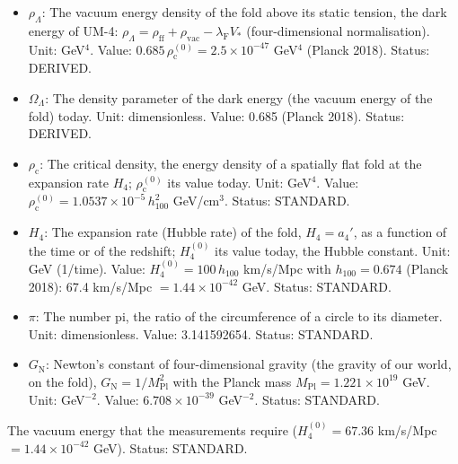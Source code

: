 \documentclass[
  10pt,
]{article}
\providecommand{\tightlist}{%
  \setlength{\itemsep}{0pt}\setlength{\parskip}{0pt}}
\begin{document}
\begin{itemize}
\tightlist
\item
  \(\rho_\Lambda\): The vacuum energy density of the fold above its
  static tension, the dark energy of UM-4:
  \(\rho_\Lambda = \rho_{\mathrm{ff}} + \rho_{\mathrm{vac}} - \lambda_{\mathrm{F}}V_*\)
  (four-dimensional normalisation). Unit: GeV\(^4\). Value:
  \(0.685\,\rho_{\mathrm{c}}^{(0)} = 2.5\times10^{-47}\) GeV\(^4\)
  (Planck 2018). Status: DERIVED.
\item
  \(\Omega_\Lambda\): The density parameter of the dark energy (the
  vacuum energy of the fold) today. Unit: dimensionless. Value: 0.685
  (Planck 2018). Status: DERIVED.
\item
  \(\rho_{\mathrm{c}}\): The critical density, the energy density of a
  spatially flat fold at the expansion rate \(H_4\);
  \(\rho_{\mathrm{c}}^{(0)}\) its value today. Unit: GeV\(^4\). Value:
  \(\rho_{\mathrm{c}}^{(0)} = 1.0537\times10^{-5}\,h_{100}^2\)
  GeV/cm\(^3\). Status: STANDARD.
\item
  \(H_4\): The expansion rate (Hubble rate) of the fold, \(H_4 = a_4'\),
  as a function of the time or of the redshift; \(H_4^{(0)}\) its value
  today, the Hubble constant. Unit: GeV (1/time). Value:
  \(H_4^{(0)} = 100\,h_{100}\) km/s/Mpc with \(h_{100} = 0.674\) (Planck
  2018): 67.4 km/s/Mpc \(= 1.44\times10^{-42}\) GeV. Status: STANDARD.
\item
  \(\pi\): The number pi, the ratio of the circumference of a circle to
  its diameter. Unit: dimensionless. Value: 3.141592654. Status:
  STANDARD.
\item
  \(G_{\mathrm{N}}\): Newton's constant of four-dimensional gravity (the
  gravity of our world, on the fold),
  \(G_{\mathrm{N}} = 1/M_{\mathrm{Pl}}^2\) with the Planck mass
  \(M_{\mathrm{Pl}} = 1.221\times10^{19}\) GeV. Unit: GeV\(^{-2}\).
  Value: \(6.708\times10^{-39}\) GeV\(^{-2}\). Status: STANDARD.
\end{itemize}

The vacuum energy that the measurements require (\(H_4^{(0)} = 67.36\)
km/s/Mpc \(= 1.44\times10^{-42}\) GeV). Status: STANDARD.
\end{document}

